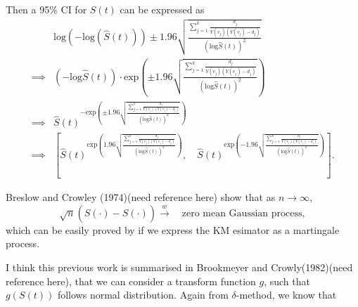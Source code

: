 \documentclass[a4paper,12pt]{article}
\begin{document}
Then a 95\% CI for $S\left(t\right)$ can be expressed as
\[
  \begin{aligned}
    & \mathrm{log}\left(-\mathrm{log}\left(\hat{S}\left(t\right)\right)\right)
    \pm 1.96\sqrt{
      \frac{
        \sum\limits_{j = 1}^k
        \frac{d_j}{Y\left(v_j\right)\left(Y\left(v_j\right) - d_j\right)}
      }{
        \left(
          \mathrm{log}\hat{S}\left(t\right)
        \right)^2
      }
    }    \\
    \implies &
    \left(-\mathrm{log}\hat{S}\left(t\right)\right)
    \cdot
    \mathrm{exp}\left(
      \pm 1.96\sqrt{
        \frac{
          \sum\limits_{j = 1}^k
          \frac{d_j}{Y\left(v_j\right)\left(Y\left(v_j\right) - d_j\right)}
        }{
          \left(
            \mathrm{log}\hat{S}\left(t\right)
          \right)^2
        }
      }
    \right)    \\
    \implies &
    \hat{S}\left(t\right)^{
      - \mathrm{exp}\left(
        \pm 1.96\sqrt{
          \frac{
            \sum\limits_{j = 1}^k
            \frac{d_j}{Y\left(v_j\right)\left(Y\left(v_j\right) - d_j\right)}
          }{
            \left(
              \mathrm{log}\hat{S}\left(t\right)
            \right)^2
          }
        }
      \right)    
    }    \\
    \implies & \left[
      \hat{S}\left(t\right)^{
        \mathrm{exp}\left(
          1.96\sqrt{
            \frac{
              \sum\limits_{j = 1}^k
              \frac{d_j}{Y\left(v_j\right)\left(Y\left(v_j\right) - d_j\right)}
            }{
              \left(
                \mathrm{log}\hat{S}\left(t\right)
              \right)^2
            }
          }
        \right) 
      }
      ,\quad
      \hat{S}\left(t\right)^{
        \mathrm{exp}\left(
          -1.96\sqrt{
            \frac{
              \sum\limits_{j = 1}^k
              \frac{d_j}{Y\left(v_j\right)\left(Y\left(v_j\right) - d_j\right)}
            }{
              \left(
                \mathrm{log}\hat{S}\left(t\right)
              \right)^2
            }
          }
        \right) 
      }
    \right]
    .
  \end{aligned}
\]
\par
{\color{red}Breslow and Crowley (1974)}{\color{blue}(need reference here)} show that as $n\to\infty$,
\[
  \sqrt{n}\left(
    \hat{S}\left(\cdot\right) - S\left(\cdot\right)
  \right)
  \overset{w}{\to}\quad
  \text{zero mean Gaussian process}
  ,
\]
which can be easily proved by if we express the KM esimator as a martingale process.
\par
I think this previous work is summarised in {\color{red}Brookmeyer and Crowly(1982)}{\color{blue}(need reference here)}, that we can consider a transform function $g$, such that $g\left(S\left(t\right)\right)$ follows normal distribution. Again from $\delta$-method, we know that
\end{document}
